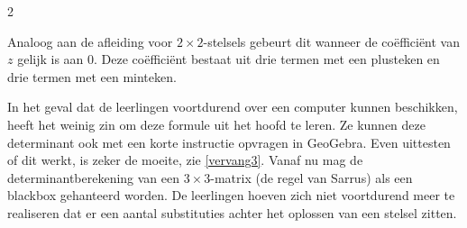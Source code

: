 
\begin{multicols}{2}

Analoog aan de afleiding voor $2 \times 2$-stelsels gebeurt dit wanneer de coëfficiënt van $z$ gelijk is aan 0. Deze coëfficiënt bestaat uit drie termen met een plusteken en drie termen met een minteken. 

In het geval dat de leerlingen voortdurend over een computer kunnen beschikken, heeft het weinig zin om deze formule uit het hoofd te leren. Ze kunnen deze determinant ook met een korte instructie opvragen in GeoGebra. Even uittesten of dit werkt, is zeker de moeite, zie \autoref{vervang3}. Vanaf nu mag de determinantberekening van een $3\times3$-matrix (de regel van Sarrus) als een blackbox gehanteerd worden. De leerlingen hoeven zich niet voortdurend meer te realiseren dat er een aantal substituties achter het oplossen van een stelsel zitten. 


\end{multicols}


